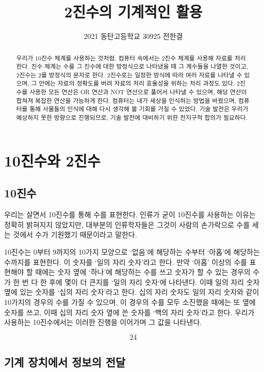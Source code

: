 \documentclass{article}
\title{2진수의 기계적인 활용}
\author{2021 동탄고등학교 30925 전한결}
\begin{document}
    
\maketitle
\pagebreak
\tableofcontents
\pagebreak

\begin{abstract}
    우리가 10진수 체계를 사용하는 것처럼, 컴퓨터 속에서는 2진수 체계를 사용해 자료를 처리한다.
    진수 체계는 수를 그 진수에 대한 방정식으로 나타냈을 때 그 계수들을 나열한 것이고, 2진수는
    2를 방정식의 문자로 한다.
    2진수로는 일정한 방식에 따라 여러 자료를 나타낼 수 있으며, 그 안에는 자료의 정확도를 버려
    자료의 처리 효율성을 위하는 처리 과정도 있다.
    2진수를 사용한 모든 연산은 OR 연산과 NOT 연산으로 풀어서
    나타낼 수 있으며, 해당 연산이 합쳐져 복잡한 연산을 가능하게 한다.
    컴퓨터는 내가 세상을 인식하는 방법을 바꿨으며, 컴퓨터를 통해 사물들의 인식에 대해
    다시 생각해 볼 기회를 가질 수 있었다.
    기술 발전은 우리가 예상하지 못한 방향으로 진행되므로, 기술 발전에 대비하기 위한 전지구적 합의가
    필요하다.
\end{abstract}

\section{10진수와 2진수}

\subsection{10진수}

우리는 살면서 10진수를 통해 수를 표현한다.
인류가 굳이 10진수를 사용하는 이유는 정확히 밝혀지지 않았지만,
대부분의 인류학자들은 그것이 사람의 손가락으로 수를 세는 것에서
수가 기원했기 때문이라고 말한다.

10진수는 0부터 9까지의 10가지 모양으로 `없음'에 해당하는 수부터 `아홉'에 해당하는
수까지를 표현한다. 이 숫자를 `일의 자리 숫자'라고 한다.
만약 `아홉' 이상의 수를 표현해야 할 때에는 숫자 옆에 `하나'에
해당하는 수를 쓰고 숫자가 할 수 있는 경우의 수가 한 번 다 한 후에 몇이 더 큰지를
`일의 자리 숫자`에 나타낸다.
이때 일의 자리 숫자 옆에 있는 숫자를 `십의 자리 숫자'라고 한다.
십의 자리 숫자도 일의 자리 숫자와 같이 10가지의 경우의 수를 가질 수 있으며,
이 경우의 수를 모두 소진했을 때에는 또 옆에 숫자를 쓰고,
이때 십의 자리 숫자 옆에 쓴 숫자를 `백의 자리 숫자'라고 한다.
우리가 사용하는 10진수에서는 이러한 진행을 이어가며 그 값을 나타낸다.

$$
24
$$

\subsection{기계 장치에서 정보의 전달}
\end{document}
